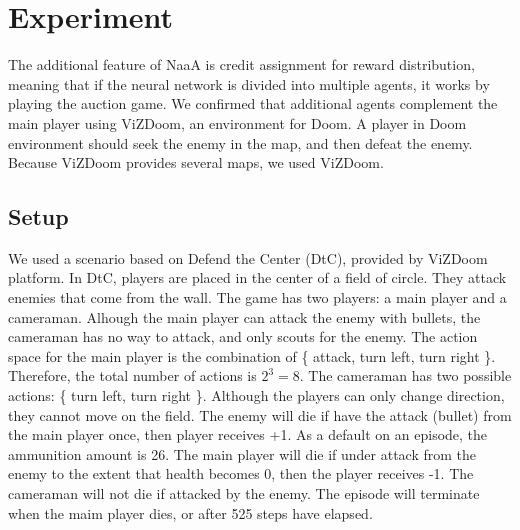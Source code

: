 \section{Experiment}


The additional feature of NaaA is credit assignment for reward distribution, 
meaning that if the neural network is divided into multiple agents, it works by playing the auction game.
We confirmed that additional agents complement the main player using ViZDoom, an environment for Doom.
A player in Doom environment should seek the enemy in the map, and then defeat the enemy.
Because ViZDoom provides several maps, we used ViZDoom.

\subsection{Setup}
We used a scenario based on Defend the Center (DtC), provided by ViZDoom platform.
In DtC, players are placed in the center of a field of circle. They attack enemies that come from the wall.
The game has two players: a main player and a cameraman.
Alhough the main player can attack the enemy with bullets, 
the cameraman has no way to attack, and only scouts for the enemy.
The action space for the main player is the combination of \{ attack, turn left, turn right \}. Therefore, the total number of actions is $2^3 = 8$.
The cameraman has two possible actions: \{ turn left, turn right \}.
Although the players can only change direction, they cannot move on the field.
The enemy will die if have the attack (bullet) from the main player once, then player receives +1.
As a default on an episode, the ammunition amount is 26.
The main player will die if under attack from the enemy to the extent that health becomes 0, then the player receives -1.
The cameraman will not die if attacked by the enemy.
The episode will terminate when the maim player dies, or after 525 steps have elapsed.

